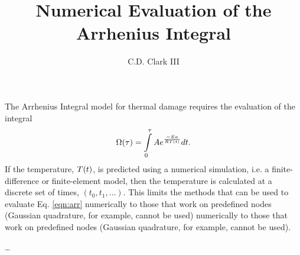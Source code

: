 \documentclass{article}
\title{Numerical Evaluation of the Arrhenius Integral}
\author{C.D. Clark III}
\begin{document}
\maketitle

The Arrhenius
Integral model for thermal damage requires the evaluation of the integral\cite{WELCH--2011--optical-thermalresponseoflaser-irradiatedtissue}
\begin{equation}
  \label{eqn:arr}
  \Omega\qty(\tau) = \int\limits_{0}^{\tau} A e^{\frac{-Ea}{RT\qty(t)}} dt.
\end{equation}
If the temperature, $T\qty(t)$, is predicted using a numerical simulation, i.e. a finite-difference or finite-element model, then the temperature is calculated at a discrete set of times, $(t_0, t_1,
\ldots)$. This limits the methods that can be used to evaluate Eq. \ref{eqn:arr} numerically to those that work on predefined nodes (Gaussian quadrature, for example, cannot be used) numerically to
those that work on predefined nodes (Gaussian quadrature, for example, cannot be used).

\ldots
\end{document}
